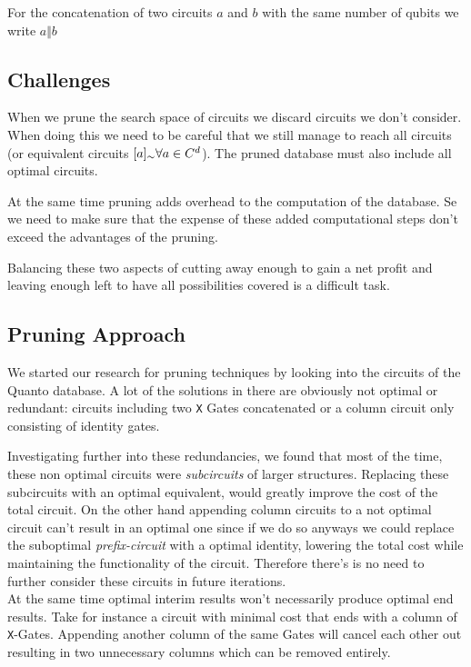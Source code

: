 For the concatenation of two circuits $a$ and $b$ with the same number of qubits we write $a\Vert b$


\subsection{Challenges}
When we prune the search space of circuits we discard circuits we don't consider. When doing this we need to be careful that we still manage to reach all circuits 
(or equivalent circuits $[a]_\sim\space\forall a\in C^d$). The pruned database must also include all optimal circuits.

At the same time pruning adds overhead to the computation of the database. Se we need to make sure that the expense of these added computational steps don't exceed the advantages of the pruning.

Balancing these two aspects of cutting away enough to gain a net profit and leaving enough left to have all possibilities covered is a difficult task.

\subsection{Pruning Approach}
We started our research for pruning techniques by looking into the circuits of the Quanto database. A lot of the solutions in there are obviously not optimal or redundant: circuits including two \texttt{X} Gates concatenated or a column circuit only consisting of identity gates. 

Investigating further into these redundancies, we found that most of the time, these non optimal circuits were \textit{subcircuits} of larger structures. Replacing these subcircuits with an optimal equivalent, would greatly improve the cost of the total circuit. On the other hand appending column circuits to a not optimal circuit can't result in an optimal one since if we do so anyways we could replace the suboptimal \textit{prefix-circuit} with a optimal identity, lowering the total cost while maintaining the functionality of the circuit. Therefore there's is no need to further consider these circuits in future iterations.\\

At the same time optimal interim results won't necessarily produce optimal end results. Take for instance a circuit with minimal cost that ends with a column of \texttt{X}-Gates. Appending another column of the same Gates will cancel each other out resulting in two unnecessary columns which can be removed entirely.\\

